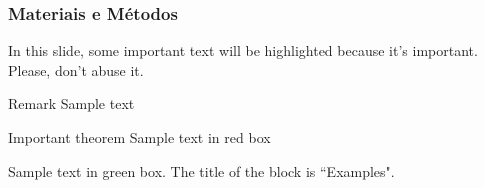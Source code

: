 \begin{frame}
\frametitle{Materiais e Métodos}

In this slide, some important text will be
\alert{highlighted} because it's important.
Please, don't abuse it.

\begin{block}{Remark}
	Sample text
\end{block}

\begin{alertblock}{Important theorem}
	Sample text in red box
\end{alertblock}

\begin{examples}
	Sample text in green box. The title of the block is ``Examples".
\end{examples}
\end{frame}